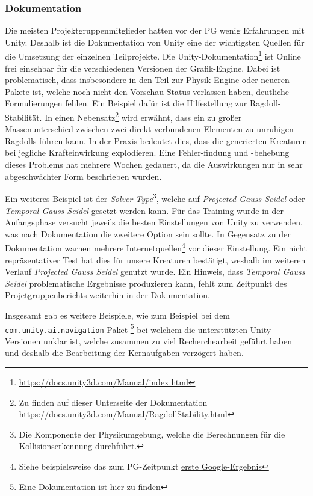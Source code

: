 \subsubsection{Dokumentation} %
Die meisten Projektgruppenmitglieder hatten vor der PG wenig Erfahrungen mit Unity. Deshalb ist die Dokumentation von Unity eine der wichtigsten Quellen für die Umsetzung der einzelnen Teilprojekte. Die Unity-Dokumentation\footnote{\url{https://docs.unity3d.com/Manual/index.html}} ist Online frei einsehbar für die verschiedenen Versionen der Grafik-Engine. Dabei ist problematisch, dass insbesondere in den Teil zur Physik-Engine oder neueren Pakete ist, welche noch nicht den Vorschau-Status verlassen haben, deutliche Formulierungen fehlen. Ein Beispiel dafür ist die Hilfestellung zur Ragdoll-Stabilität. In einen Nebensatz\footnote{Zu finden auf dieser Unterseite der Dokumentation \url{https://docs.unity3d.com/Manual/RagdollStability.html}} wird erwähnt, dass ein zu großer Massenunterschied zwischen zwei direkt verbundenen Elementen zu unruhigen Ragdolls führen kann. In der Praxis bedeutet dies, dass die generierten Kreaturen bei jegliche Krafteinwirkung explodieren. Eine Fehler-findung und -behebung dieses Problems hat mehrere Wochen gedauert, da die Auswirkungen nur in sehr abgeschwächter Form beschrieben wurden.

Ein weiteres Beispiel ist der \emph{Solver Type}\footnote{Die Komponente der Physikumgebung, welche die Berechnungen für die Kollisionserkennung durchführt.}, welche auf \emph{Projected Gauss Seidel} oder \emph{Temporal Gauss Seidel} gesetzt werden kann. Für das Training wurde in der Anfangsphase versucht jeweils die besten Einstellungen von Unity zu verwenden, was nach Dokumentation die zweitere Option sein sollte. In Gegensatz zu der Dokumentation warnen mehrere Internetquellen\footnote{Siehe beispielsweise das zum PG-Zeitpunkt \href{https://www.youtube.com/watch?v=aZ1zc6zZ61E}{erste Google-Ergebnis}} vor dieser Einstellung. Ein nicht repräsentativer Test hat dies für unsere Kreaturen bestätigt, weshalb im weiteren Verlauf \emph{Projected Gauss Seidel} genutzt wurde. Ein Hinweis, dass \emph{Temporal Gauss Seidel} problematische Ergebnisse produzieren kann, fehlt zum Zeitpunkt des Projetgruppenberichts weiterhin in der Dokumentation.

Insgesamt gab es weitere Beispiele, wie zum Beispiel bei dem \texttt{com.unity.ai.navigation}-Paket \footnote{Eine Dokumentation ist \href{https://docs.unity3d.com/Packages/com.unity.ai.navigation@1.0/manual/NavMeshSurface.html}{hier} zu finden} bei welchem die unterstützten Unity-Versionen unklar ist, welche zusammen zu viel Recherchearbeit geführt haben und deshalb die Bearbeitung der Kernaufgaben verzögert haben.

